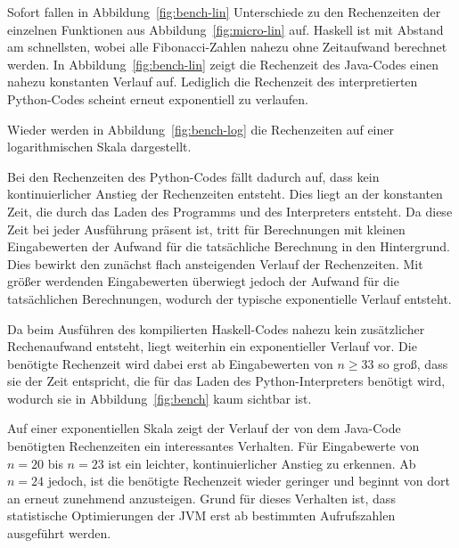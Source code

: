 \documentclass[11pt, parskip=half]{scrartcl}       %
\begin{document}
Sofort fallen in Abbildung~\ref{fig:bench-lin} Unterschiede zu den Rechenzeiten der einzelnen Funktionen aus Abbildung~\ref{fig:micro-lin} auf.
Haskell ist mit Abstand am schnellsten, wobei alle Fibonacci-Zahlen nahezu ohne Zeitaufwand berechnet werden.
In Abbildung~\ref{fig:bench-lin} zeigt die Rechenzeit des Java-Codes einen nahezu konstanten Verlauf auf.
Lediglich die Rechenzeit des interpretierten Python-Codes scheint erneut exponentiell zu verlaufen.

Wieder werden in Abbildung~\ref{fig:bench-log} die Rechenzeiten auf einer logarithmischen Skala dargestellt.

Bei den Rechenzeiten des Python-Codes fällt dadurch auf, dass kein kontinuierlicher Anstieg der Rechenzeiten entsteht.
Dies liegt an der konstanten Zeit, die durch das Laden des Programms und des Interpreters entsteht.
Da diese Zeit bei jeder Ausführung präsent ist, tritt für Berechnungen mit kleinen Eingabewerten der Aufwand für die tatsächliche Berechnung in den Hintergrund.
Dies bewirkt den zunächst flach ansteigenden Verlauf der Rechenzeiten.
Mit größer werdenden Eingabewerten überwiegt jedoch der Aufwand für die tatsächlichen Berechnungen, wodurch der typische exponentielle Verlauf entsteht.

Da beim Ausführen des kompilierten Haskell-Codes nahezu kein zusätzlicher Rechenaufwand entsteht, liegt weiterhin ein exponentieller Verlauf vor.
Die benötigte Rechenzeit wird dabei erst ab Eingabewerten von $n \ge 33$ so groß, dass sie der Zeit entspricht, die für das Laden des Python-Interpreters benötigt wird, wodurch sie in Abbildung~\ref{fig:bench} kaum sichtbar ist.

Auf einer exponentiellen Skala zeigt der Verlauf der von dem Java-Code benötigten Rechenzeiten
ein interessantes Verhalten.
Für Eingabewerte von $n = 20$ bis $n = 23$ ist ein leichter, kontinuierlicher Anstieg zu erkennen.
Ab $n = 24$ jedoch, ist die benötigte Rechenzeit wieder geringer und beginnt von dort an erneut zunehmend anzusteigen.
Grund für dieses Verhalten ist, dass statistische Optimierungen der JVM erst ab bestimmten Aufrufszahlen ausgeführt werden.
\end{document}
